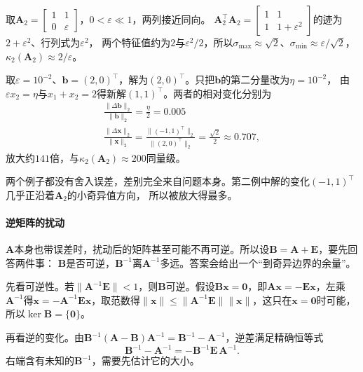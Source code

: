 \begin{example}[近平行列的右端扰动]
\label{ex:ls-rhs-perturbation-near-parallel}
取$\bm A_2=\left[\begin{smallmatrix}1&1\\0&\varepsilon\end{smallmatrix}\right]$，$0<\varepsilon\ll1$，两列接近同向。
$\bm A_2^\top\bm A_2=\left[\begin{smallmatrix}1&1\\1&1+\varepsilon^2\end{smallmatrix}\right]$的迹为$2+\varepsilon^2$、行列式为$\varepsilon^2$，
两个特征值约为$2$与$\varepsilon^2/2$，所以$\sigma_{\max}\approx\sqrt2$、$\sigma_{\min}\approx\varepsilon/\sqrt2$，$\kappa_2(\bm A_2)\approx2/\varepsilon$。

取$\varepsilon=10^{-2}$、$\bm b=(2,0)^\top$，解为$(2,0)^\top$。只把$\bm b$的第二分量改为$\eta=10^{-2}$，
由$\varepsilon x_2=\eta$与$x_1+x_2=2$得新解$(1,1)^\top$。两者的相对变化分别为
\[
 \begin{gathered}
\frac{\lVert\Delta\bm b\rVert_2}{\lVert\bm b\rVert_2}=\frac{\eta}{2}=0.005\\
\frac{\lVert\Delta\bm x\rVert_2}{\lVert\bm x\rVert_2}=\frac{\lVert(-1,1)^\top\rVert_2}{\lVert(2,0)^\top\rVert_2}=\frac{\sqrt2}{2}\approx0.707,
 \end{gathered}
\]
放大约$141$倍，与$\kappa_2(\bm A_2)\approx200$同量级。
\end{example}

两个例子都没有舍入误差，差别完全来自问题本身。第二例中解的变化$(-1,1)^\top$几乎正沿着$\bm A_2$的小奇异值方向，
所以被放大得最多。

\paragraph{逆矩阵的扰动}
\label{sec:ls-inverse-sensitivity}
\label{sec:ch06-inverse-stability}

$\bm A$本身也带误差时，扰动后的矩阵甚至可能不再可逆。所以设$\bm B=\bm A+\bm E$，要先回答两件事：
$\bm B$是否可逆，$\bm B^{-1}$离$\bm A^{-1}$多远。答案会给出一个“到奇异边界的余量”。

先看可逆性。若$\lVert\bm A^{-1}\bm E\rVert<1$，则$\bm B$可逆。假设$\bm B\bm x=\bm0$，即$\bm A\bm x=-\bm E\bm x$，左乘$\bm A^{-1}$得$\bm x=-\bm A^{-1}\bm E\bm x$，取范数得$\lVert\bm x\rVert\leq\lVert\bm A^{-1}\bm E\rVert\lVert\bm x\rVert$，这只在$\bm x=\bm0$时可能，所以$\ker\bm B=\{\bm0\}$。

再看逆的变化。由$\bm B^{-1}(\bm A-\bm B)\bm A^{-1}=\bm B^{-1}-\bm A^{-1}$，逆差满足精确恒等式
\begin{equation}
 \bm B^{-1}-\bm A^{-1}
 =-\bm B^{-1}\bm E\,\bm A^{-1}.
 \label{eq:ch06-inverse-finite-perturbation}
\end{equation}
右端含有未知的$\bm B^{-1}$，需要先估计它的大小。

